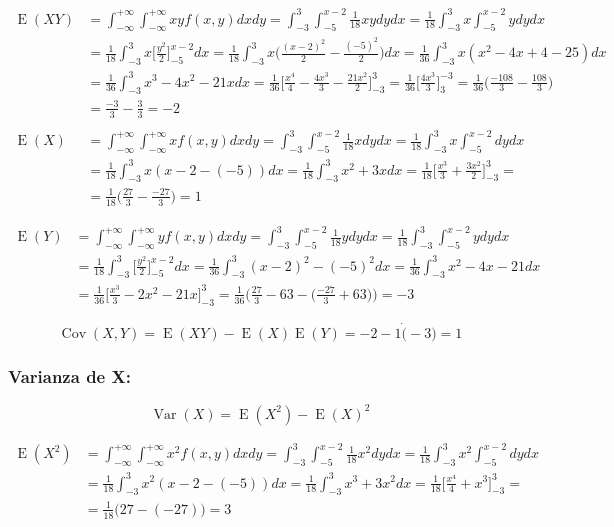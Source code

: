 \documentclass[tikz]{article}
\DeclareMathOperator{\Var}{Var}
\DeclareMathOperator{\Cov}{Cov}
\DeclareMathOperator{\Expected}{E}
\begin{document}
\begin{align*}
  \Expected(XY)&=\int_{-\infty}^{+\infty}\int_{-\infty}^{+\infty}xyf(x,y)dxdy=\int_{-3}^3\int_{-5}^{x-2}\frac{1}{18}xydydx=\frac{1}{18}\int_{-3}^3x\int_{-5}^{x-2}ydydx \\
               &=\frac{1}{18}\int_{-3}^3x\bigg[\frac{y^2}{2}\bigg]_{-5}^{x-2}dx=\frac{1}{18}\int_{-3}^3x\bigg(\frac{(x-2)^2}{2}-\frac{(-5)^2}{2}\bigg)dx=\frac{1}{36}\int_{-3}^3x(x^2-4x+4-25)dx \\
               &=\frac{1}{36}\int_{-3}^3x^3-4x^2-21xdx=\frac{1}{36}\bigg[\frac{x^4}{4}-\frac{4x^3}{3}-\frac{21x^2}{2}\bigg]_{-3}^3=\frac{1}{36}\bigg[\frac{4x^3}{3}\bigg]_3^{-3}=\frac{1}{36}\bigg(\frac{-108}{3}-\frac{108}{3}\bigg) \\
               &=\frac{-3}{3}-\frac{3}{3}=-2 \\
  ~\\
  \Expected(X)&=\int_{-\infty}^{+\infty}\int_{-\infty}^{+\infty}xf(x,y)dxdy=\int_{-3}^3\int_{-5}^{x-2}\frac{1}{18}xdydx=\frac{1}{18}\int_{-3}^3x\int_{-5}^{x-2}dydx \\
               &=\frac{1}{18}\int_{-3}^3x(x-2-(-5))dx=\frac{1}{18}\int_{-3}^{3}x^2+3xdx=\frac{1}{18}\bigg[\frac{x^3}{3}+\frac{3x^2}{2}\bigg]_{-3}^3= \\
               &=\frac{1}{18}\bigg(\frac{27}{3}-\frac{-27}{3}\bigg)=1
\end{align*}

\begin{align*}
  \Expected(Y)&=\int_{-\infty}^{+\infty}\int_{-\infty}^{+\infty}yf(x,y)dxdy=\int_{-3}^3\int_{-5}^{x-2}\frac{1}{18}ydydx=\frac{1}{18}\int_{-3}^3\int_{-5}^{x-2}ydydx \\
              &=\frac{1}{18}\int_{-3}^3\bigg[\frac{y^2}{2}\bigg]_{-5}^{x-2}dx=\frac{1}{36}\int_{-3}^{3}(x-2)^2-(-5)^2dx=\frac{1}{36}\int_{-3}^{3}x^2-4x-21dx \\ &=\frac{1}{36}\bigg[\frac{x^3}{3}-2x^2-21x\bigg]_{-3}^3=\frac{1}{36}\bigg(\frac{27}{3}-63-\Big(\frac{-27}{3}+63\Big)\bigg)=-3
\end{align*}

\[\Cov(X,Y)=\Expected(XY)-\Expected(X)\Expected(Y)=-2-1\dot(-3)=1\]

\subsubsection*{Varianza de X:}

\[\Var(X)=\Expected(X^2)-\Expected(X)^2\]

\begin{align*}
  \Expected(X^2)&=\int_{-\infty}^{+\infty}\int_{-\infty}^{+\infty}x^2f(x,y)dxdy=\int_{-3}^3\int_{-5}^{x-2}\frac{1}{18}x^2dydx=\frac{1}{18}\int_{-3}^3x^2\int_{-5}^{x-2}dydx \\
                &=\frac{1}{18}\int_{-3}^3x^2(x-2-(-5))dx=\frac{1}{18}\int_{-3}^{3}x^3+3x^2dx=\frac{1}{18}\bigg[\frac{x^4}{4}+x^3\bigg]_{-3}^3= \\
                &=\frac{1}{18}\Big(27-(-27)\Big)=3
\end{align*}
\end{document}
